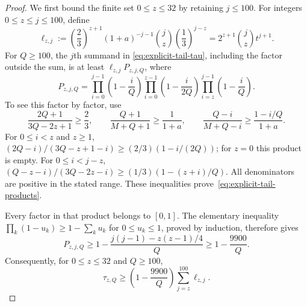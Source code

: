 \documentclass[11pt]{article}
\begin{document}
\begin{proof}
We first bound the finite set $0\le z\le32$ by retaining $j\le100$.
For integers $0\le z\le j\le100$, define
\begin{equation}
 \ell_{z,j}:=\left(\frac23\right)^{z+1}(1+a)^{-j-1}
       \binom jz\left(\frac13\right)^{j-z}
       =2^{z+1}\binom jz t^{j+1}.
\end{equation}
For $Q\ge100$, the $j$th summand in
\eqref{eq:explicit-tail-tau}, including the factor outside the sum, is at
least $\ell_{z,j}P_{z,j,Q}$, where
\begin{equation}\label{eq:explicit-tail-products}
 P_{z,j,Q}=
 \prod_{i=0}^{j-1}\left(1-\frac iQ\right)
 \prod_{i=0}^{z-1}\left(1-\frac i{2Q}\right)
 \prod_{i=z}^{j-1}\left(1-\frac iQ\right).
\end{equation}
To see this factor by factor, use
\begin{equation}
 \frac{2Q+1}{3Q-2z+1}\ge\frac23,\qquad
 \frac{Q+1}{M+Q+1}\ge\frac1{1+a},\qquad
 \frac{Q-i}{M+Q-i}\ge\frac{1-i/Q}{1+a}.
\end{equation}
For $0\le i<z$ and $z\ge1$,
$(2Q-i)/(3Q-z+1-i)\ge(2/3)(1-i/(2Q))$;
for $z=0$ this product is empty. For $0\le i<j-z$,
$(Q-z-i)/(3Q-2z-i)\ge(1/3)(1-(z+i)/Q)$.
All denominators are positive in the stated range. These inequalities
prove~\eqref{eq:explicit-tail-products}.

Every factor in that product belongs to $[0,1]$. The elementary inequality
$\prod_k(1-u_k)\ge1-\sum_k u_k$ for $0\le u_k\le1$, proved by induction,
therefore gives
\begin{equation}
 P_{z,j,Q}\ge
 1-\frac{j(j-1)-z(z-1)/4}{Q}\ge1-\frac{9900}{Q}.
\end{equation}
Consequently, for $0\le z\le32$ and $Q\ge100$,
\begin{equation}\label{eq:explicit-tail-truncated}
 \tau_{z,Q}\ge\left(1-\frac{9900}{Q}\right)
                        \sum_{j=z}^{100}\ell_{z,j}.
\end{equation}


\end{proof}
\end{document}
